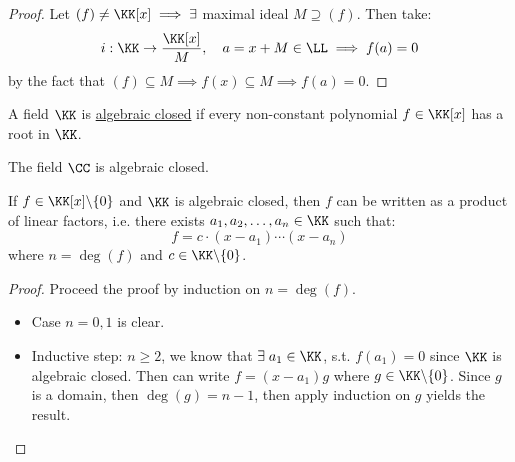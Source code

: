 \begin{proof}
	Let \( (f) \ne \KK[x] \implies \exists \) maximal ideal \( M \supseteq (f) \). Then take:
	\[
		i: \KK \to \frac{\KK[x]}{M}, \quad a = x + M \in \LL \implies f(a) = 0
	\]
	by the fact that \( (f) \subseteq M \implies f(x) \subseteq M \implies f(a) = 0\).
\end{proof}

\begin{definition}
	A field \( \KK \) is \underline{algebraic closed} if every non-constant polynomial \( f \in \KK[x]
	\) has a root in \( \KK \).
\end{definition}

\begin{theorem}
	The field \( \CC \) is algebraic closed.
\end{theorem}

\begin{proposition}
	If \( f \in \KK[x] \backslash \{0\} \) and \( \KK \) is algebraic closed, then \( f \) can be
	written as a product of linear factors, i.e. there exists \( a_1, a_2, \dots, a_n \in \KK \) such
	that:
	\[
		f = c \cdot (x-a_1)\cdots (x-a_n)
	\]
	where \( n = \deg(f) \) and \( c\in \KK\backslash\{0\} \).
\end{proposition}

\begin{proof}
	Proceed the proof by induction on \( n = \deg(f) \).
	\begin{itemize}
		\item Case \( n=0,1 \) is clear.
		\item Inductive step: \( n\geq 2 \), we know that \( \exists \; a_1\in \KK \), s.t. \( f(a_1) =
		      0\) since \( \KK \) is algebraic closed. Then can write \( f = (x-a_1)g \) where \( g\in
		      \KK\backslash \{0\} \). Since \( g \) is a domain, then \( \deg(g) = n-1 \), then apply
		      induction on \( g \) yields the result.
	\end{itemize}
\end{proof}

